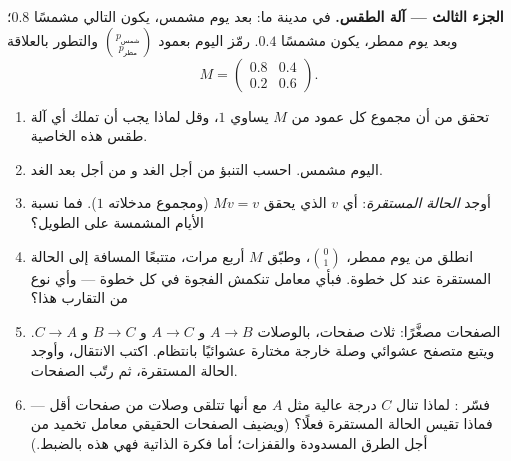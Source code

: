 \begin{problem}
\medskip
\noindent\textbf{الجزء الثالث --- آلة الطقس.}
في مدينة ما: بعد يوم مشمس، يكون التالي مشمسًا 
$0.8$؛ وبعد يوم ممطر، يكون مشمسًا 
$0.4$. رمّز  اليوم بعمود
$\binom{p_{\text{شمس}}}{p_{\text{مطر}}}$ والتطور بالعلاقة
\[
M = \begin{pmatrix} 0.8 & 0.4\\ 0.2 & 0.6 \end{pmatrix}.
\]
\begin{enumerate}[resume]
  \item تحقق من أن مجموع كل عمود من $M$ يساوي $1$، وقل لماذا
        يجب أن تملك أي آلة طقس هذه الخاصية.
  \item اليوم مشمس. احسب التنبؤ من أجل الغد و
        من أجل بعد الغد.
  \item أوجد \emph{الحالة المستقرة}: أي  $v$ الذي يحقق
        $Mv = v$ (ومجموع مدخلاته $1$). فما نسبة
        الأيام المشمسة على  الطويل؟
  \item انطلق من يوم ممطر، $\binom01$، وطبّق $M$ أربع
        مرات، متتبعًا المسافة إلى الحالة المستقرة عند
        كل خطوة. فبأي معامل تنكمش الفجوة في كل خطوة ---
        وأي نوع من التقارب هذا؟
  \item {} الصفحات مصغَّرًا: ثلاث صفحات، بالوصلات
        $A \to B$ و $A \to C$ و $B \to C$ و $C \to A$. ويتبع متصفح
        عشوائي وصلة خارجة مختارة عشوائيًا بانتظام.
        اكتب  الانتقال، وأوجد الحالة المستقرة، ثم
        رتّب الصفحات.
  \item فسّر : لماذا تنال $C$ درجة عالية مثل
        $A$ مع أنها تتلقى وصلات من صفحات أقل --- فماذا
        تقيس الحالة المستقرة فعلًا؟ (ويضيف  الصفحات الحقيقي
        معامل تخميد من أجل الطرق المسدودة والقفزات؛ أما فكرة
         الذاتية فهي هذه بالضبط.)
\end{enumerate}


\end{problem}
